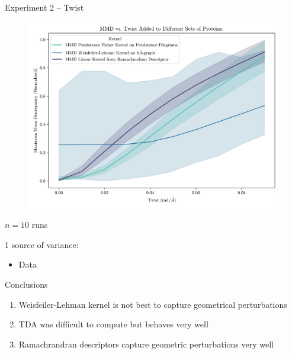 \documentclass[aspectratio=169, 10pt, dvipsnames]{beamer}
\begin{document}
  {
\begin{frame}[fragile]{Experiment 2 -- Twist}
  \begin{minipage}{0.6\linewidth}
    \begin{figure}
      \centering
      \includegraphics[width=\textwidth]{./figures/twist.png}
    \end{figure}
  \end{minipage}
  \begin{minipage}{0.38\linewidth}
    \pause $n=10$ runs

    \pause\small 1 source of variance:
    \begin{itemize}
      \pause\small\item Data
  \end{itemize}

  \begin{alert}{Conclusions}
    \begin{enumerate}
      \pause\item Weisfeiler-Lehman kernel is not best to capture geometrical perturbations
      \pause\item TDA was difficult to compute but behaves very well
      \pause\item Ramachrandran descriptors capture geometric perturbations very well
    \end{enumerate}
  \end{alert}
  \end{minipage}
\end{frame}
}
\end{document}
